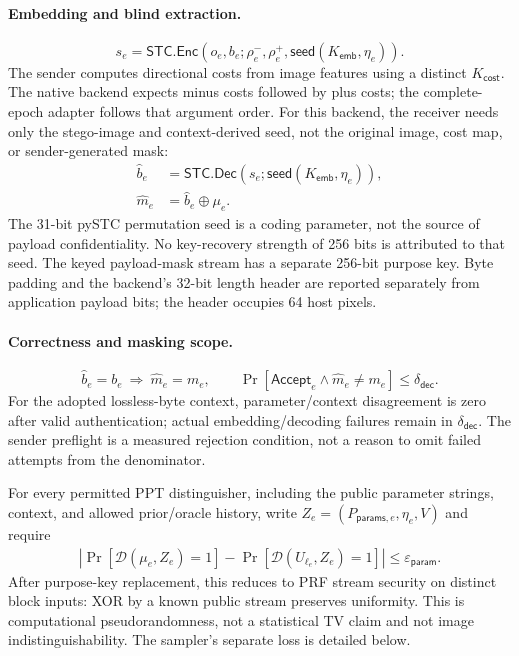 \documentclass[journal]{IEEEtran}
\theoremstyle{definition}
\theoremstyle{game}
\begin{document}
\paragraph{Embedding and blind extraction.}
\begin{equation}\label{supp-eq:qim-theoretical-embedding}
s_e=\mathsf{STC.Enc}(o_e,b_e;\rho_e^-,\rho_e^+,\mathsf{seed}(K_{\mathsf{emb}},\eta_e)).
\end{equation}
The sender computes directional costs from image features using a distinct
$K_{\mathsf{cost}}$. The native backend expects minus costs followed by plus
costs; the complete-epoch adapter follows that argument order. For this backend,
the receiver needs only the stego-image and context-derived seed, not
the original image, cost map, or sender-generated mask:
\begin{align}\label{supp-eq:qim-extracted-payload}
\widehat b_e&=\mathsf{STC.Dec}(s_e;\mathsf{seed}(K_{\mathsf{emb}},\eta_e)),\\
\label{supp-eq:qim-theoretical-unmasking}
\widehat m_e&=\widehat b_e\oplus\mu_e.
\end{align}
The 31-bit pySTC permutation seed is a coding parameter, not the source of
payload confidentiality. No key-recovery strength of 256 bits is attributed
to that seed. The keyed payload-mask stream has a separate 256-bit purpose key.
Byte padding and the backend's 32-bit length header are reported separately
from application payload bits; the header occupies 64 host pixels.

\paragraph{Correctness and masking scope.}
\begin{equation}\label{supp-eq:qim-mask-correctness}
\widehat b_e=b_e\ \Longrightarrow\ \widehat m_e=m_e,\qquad
\Pr[\mathsf{Accept}_e\wedge\widehat m_e\ne m_e]\le\delta_{\mathsf{dec}}.
\end{equation}
For the adopted lossless-byte context, parameter/context disagreement is
zero after valid authentication; actual embedding/decoding failures remain
in $\delta_{\mathsf{dec}}$. The sender preflight is a measured rejection
condition, not a reason to omit failed attempts from the denominator.

For every permitted PPT distinguisher, including the public parameter
strings, context, and allowed prior/oracle history, write $Z_e=(P_{\mathsf{params},e},\eta_e,V)$ and require
\begin{align}\label{supp-eq:qim-mask-pseudorandomness}
\left|\Pr[\mathcal D(\mu_e,Z_e)=1]
-\Pr[\mathcal D(U_{\ell_e},Z_e)=1]\right|
\le\varepsilon_{\mathsf{param}}.
\end{align}
After purpose-key replacement, this reduces to PRF stream security on
distinct block inputs: XOR by a known public stream preserves uniformity.
This is computational pseudorandomness, not a statistical TV claim and not
image indistinguishability. The sampler's separate loss is detailed below.
\end{document}
